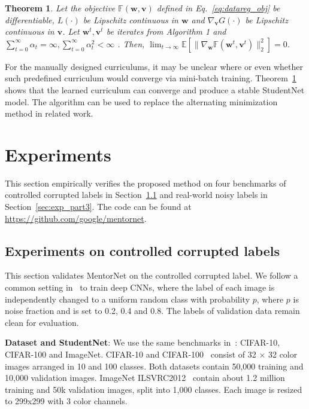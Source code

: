 \documentclass{article}
\newtheorem{theorem}{Theorem}
\begin{document}
\begin{theorem}
\label{theorem:1}
Let the objective $\mathbb{F}(\mathbf{w}, \mathbf{v})$ defined in Eq.~\eqref{eq:datareg_obj} be differentiable, $L(\cdot)$ be Lipschitz continuous in $\mathbf{w}$ and $\nabla_{\mathbf{v}}G(\cdot)$ be Lipschitz continuous in $\mathbf{v}$.
Let $\mathbf{w}^{t}, \mathbf{v}^{t}$ be iterates from Algorithm 1 and $\sum_{t=0}^{\infty} \alpha_t = \infty, \sum_{t=0}^{\infty} \alpha_t^2 < \infty$ . Then,
$\lim_{t\rightarrow \infty} \mathbb{E}[\|\nabla_{\mathbf{w}} \mathbb{F}(\mathbf{w}^{t}, \mathbf{v}^{t})\|_2^2] = 0$.
\vspace{-2mm}
\end{theorem}

For the manually designed curriculums, it may be unclear where or even whether such predefined curriculum would converge via mini-batch training. Theorem~\ref{theorem:1} shows that the learned curriculum can converge and produce a stable StudentNet model. The algorithm can be used to replace the alternating minimization method in related work. 


\vspace{-3mm}
\section{Experiments}
This section empirically verifies the proposed method on four benchmarks of controlled corrupted labels in Section~\ref{sec:exp_part2} and real-world noisy labels in Section~\ref{sec:exp_part3}. The code can be found at {\small \url{https://github.com/google/mentornet}}.


\vspace{-2mm}
\subsection{Experiments on controlled corrupted labels}\label{sec:exp_part2}
\vspace{-2mm}
This section validates MentorNet on the controlled corrupted label. We follow a common setting in~\cite{zhang2017understanding} to train deep CNNs, where the label of each image is independently changed to a uniform random class with probability $p$, where $p$ is noise fraction and is set to 0.2, 0.4 and 0.8. The labels of validation data remain clean for evaluation.


\noindent\textbf{Dataset and StudentNet}: We use the same benchmarks in~\cite{zhang2017understanding}: CIFAR-10, CIFAR-100 and ImageNet. CIFAR-10 and CIFAR-100~\cite{krizhevsky2009learning} consist of 32 $\times$ 32 color images arranged in 10 and 100 classes. Both datasets contain 50,000 training and 10,000 validation images. ImageNet ILSVRC2012~\cite{deng2009imagenet} contain about 1.2 million training and 50k validation images, split into 1,000 classes. Each image is resized to 299x299 with 3 color channels.
\end{document}
